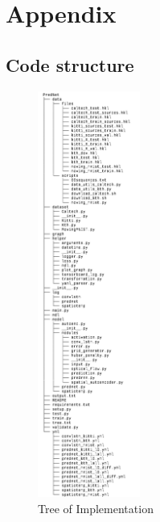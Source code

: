 \section{Appendix} \label{section::appendix}
 \subsection*{Code structure}
  \begin{figure}[H]
   \includegraphics[width=0.3\textwidth]{../Images/tree.png}
   \centering
   \caption{Tree of Implementation}
   \label{fig:tree}
  \end{figure}\noindent
